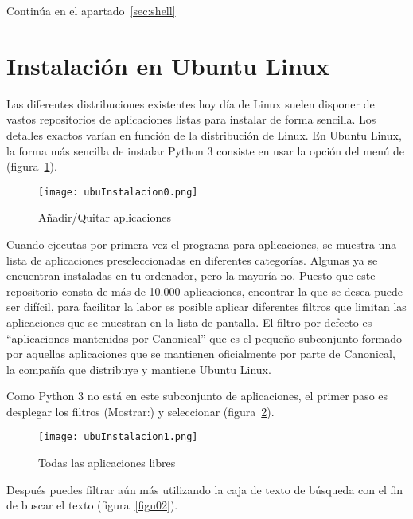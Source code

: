 Continúa en el apartado~\ref{sec:shell}

\section{Instalación en Ubuntu Linux}

Las diferentes distribuciones existentes hoy día de Linux suelen disponer de vastos repositorios de aplicaciones listas para instalar de forma sencilla. Los detalles exactos varían en función de la distribución de Linux. En Ubuntu Linux, la forma más sencilla de instalar Python 3 consiste en usar la opción  del menú de  (figura~\ref{figu00}).

\begin{figure}[!h]
  \begin{center}
\texttt{[image: ubuInstalacion0.png]}
\caption{Añadir/Quitar aplicaciones}\label{figu00}
  \end{center}
\end{figure}

Cuando ejecutas por primera vez el programa para  aplicaciones, se muestra una lista de aplicaciones preseleccionadas en diferentes categorías. Algunas ya se encuentran instaladas en tu ordenador, pero la mayoría no. Puesto que este repositorio consta de más de 10.000 aplicaciones, encontrar la que se desea puede ser difícil, para facilitar la labor es posible aplicar diferentes filtros que limitan las aplicaciones que se muestran en la lista de pantalla. El filtro por defecto es ``aplicaciones mantenidas por Canonical'' que es el pequeño subconjunto formado por aquellas aplicaciones que se mantienen oficialmente por parte de Canonical, la compañía que distribuye y mantiene Ubuntu Linux.

Como Python 3 no está en este subconjunto de aplicaciones, el primer paso es desplegar los filtros (Mostrar:) y seleccionar  (figura~\ref{figu01}).

\begin{figure}[!h]
  \begin{center}
\texttt{[image: ubuInstalacion1.png]}
\caption{Todas las aplicaciones libres}\label{figu01}
  \end{center}
\end{figure}

Después puedes filtrar aún más utilizando la caja de texto de búsqueda con el fin de buscar el texto  (figura~\ref{figu02}).

